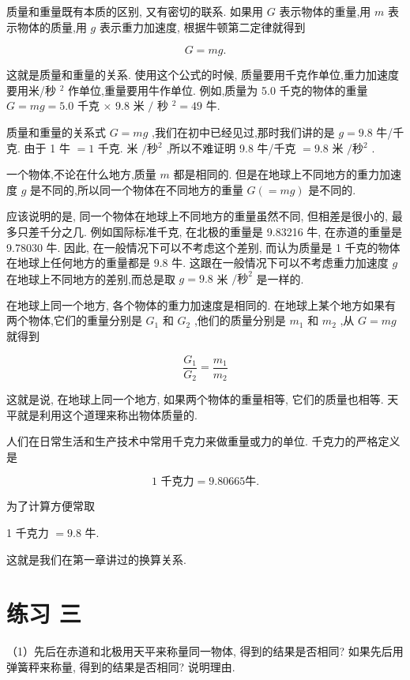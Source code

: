\documentclass[10pt]{article}
\begin{document}
质量和重量既有本质的区别, 又有密切的联系. 如果用 \(G\) 表示物体的重量,用 \(m\) 表示物体的质量,用 \(g\) 表示重力加速度, 根据牛顿第二定律就得到

\[
G = {mg}\text{.}
\]

这就是质量和重量的关系. 使用这个公式的时候, 质量要用千克作单位,重力加速度要用米/秒 \({}^{2}\) 作单位,重量要用牛作单位. 例如,质量为 5.0 千克的物体的重量 \(G = {mg} = {5.0}\) 千克 \(\times\) 9.8 米 \(/\) 秒 \({}^{2} = {49}\) 牛.

质量和重量的关系式 \(G = {mg}\) ,我们在初中已经见过,那时我们讲的是 \(g = {9.8}\) 牛/千克. 由于 1 牛 \(= 1\) 千克. 米 \(/秒{}^{2}\) ,所以不难证明 9.8 牛/千克 \(= {9.8}\) 米 \(/秒{}^{2}\) .

一个物体,不论在什么地方,质量 \(m\) 都是相同的. 但是在地球上不同地方的重力加速度 \(g\) 是不同的,所以同一个物体在不同地方的重量 \(G\left( { = {mg}}\right)\) 是不同的.

应该说明的是, 同一个物体在地球上不同地方的重量虽然不同, 但相差是很小的, 最多只差千分之几. 例如国际标准千克, 在北极的重量是 9.83216 牛, 在赤道的重量是 9.78030 牛. 因此, 在一般情况下可以不考虑这个差别, 而认为质量是 1 千克的物体在地球上任何地方的重量都是 9.8 牛. 这跟在一般情况下可以不考虑重力加速度 \(g\) 在地球上不同地方的差别,而总是取 \(g = {9.8}\) 米 \(/{\text{秒}}^{2}\) 是一样的.

在地球上同一个地方, 各个物体的重力加速度是相同的. 在地球上某个地方如果有两个物体,它们的重量分别是 \({G}_{1}\) 和 \({G}_{2}\) ,他们的质量分别是 \({m}_{1}\) 和 \({m}_{2}\) ,从 \(G = {mg}\) 就得到

\[
\frac{{G}_{1}}{{G}_{2}} = \frac{{m}_{1}}{{m}_{2}}
\]

这就是说, 在地球上同一个地方, 如果两个物体的重量相等, 它们的质量也相等. 天平就是利用这个道理来称出物体质量的.

人们在日常生活和生产技术中常用千克力来做重量或力的单位. 千克力的严格定义是

\[
\text{1 千克力} = {9.80665}\text{牛.}
\]

为了计算方便常取

1 千克力 \(= {9.8}\) 牛.

这就是我们在第一章讲过的换算关系.

\section*{练习 三}

（1）先后在赤道和北极用天平来称量同一物体, 得到的结果是否相同? 如果先后用弹簧秤来称量, 得到的结果是否相同? 说明理由.
\end{document}
